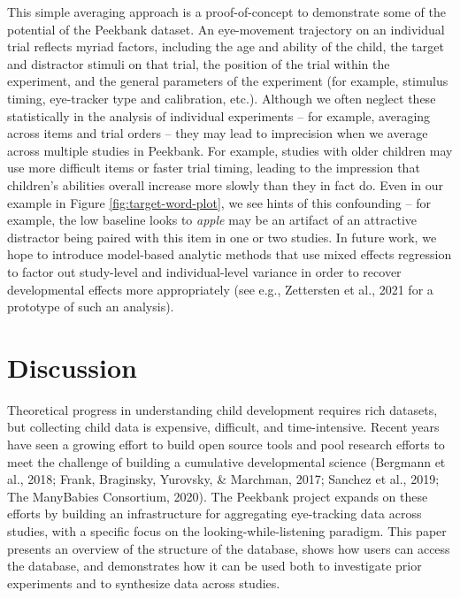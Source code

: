 \documentclass[
  english,
  man,floatsintext]{apa6}
\begin{document}
This simple averaging approach is a proof-of-concept to demonstrate some of the potential of the Peekbank dataset.
An eye-movement trajectory on an individual trial reflects myriad factors, including the age and ability of the child, the target and distractor stimuli on that trial, the position of the trial within the experiment, and the general parameters of the experiment (for example, stimulus timing, eye-tracker type and calibration, etc.).
Although we often neglect these statistically in the analysis of individual experiments -- for example, averaging across items and trial orders -- they may lead to imprecision when we average across multiple studies in Peekbank.
For example, studies with older children may use more difficult items or faster trial timing, leading to the impression that children's abilities overall increase more slowly than they in fact do.
Even in our example in Figure \ref{fig:target-word-plot}, we see hints of this confounding -- for example, the low baseline looks to \emph{apple} may be an artifact of an attractive distractor being paired with this item in one or two studies.
In future work, we hope to introduce model-based analytic methods that use mixed effects regression to factor out study-level and individual-level variance in order to recover developmental effects more appropriately (see e.g., Zettersten et al., 2021 for a prototype of such an analysis).

\hypertarget{discussion}{%
\section{Discussion}\label{discussion}}

Theoretical progress in understanding child development requires rich datasets, but collecting child data is expensive, difficult, and time-intensive.
Recent years have seen a growing effort to build open source tools and pool research efforts to meet the challenge of building a cumulative developmental science (Bergmann et al., 2018; Frank, Braginsky, Yurovsky, \& Marchman, 2017; Sanchez et al., 2019; The ManyBabies Consortium, 2020).
The Peekbank project expands on these efforts by building an infrastructure for aggregating eye-tracking data across studies, with a specific focus on the looking-while-listening paradigm.
This paper presents an overview of the structure of the database, shows how users can access the database, and demonstrates how it can be used both to investigate prior experiments and to synthesize data across studies.
\end{document}
